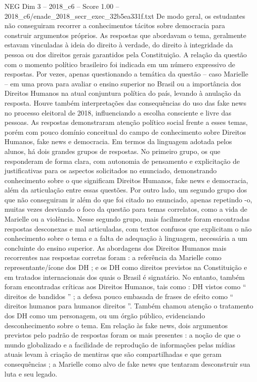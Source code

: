 \begin{textsample}{NEG Dim 3 – 2018\_c6 – Score 1.00 – 2018\_c6/enade\_2018\_secr\_exec\_32b5ea331f.txt}
De modo geral, os estudantes não conseguiram recorrer a conhecimentos tácitos sobre democracia para construir argumentos próprios.
As respostas que abordavam o tema, geralmente estavam vinculadas à ideia do direito à verdade, do direito à integridade da pessoa ou dos direitos gerais garantidos pela Constituição.
A relação da questão com o momento político brasileiro foi indicada em um número expressivo de respostas.
Por vezes, apenas questionando a temática da questão – caso Marielle – em uma prova para avaliar o ensino superior no Brasil ou a importância dos Direitos Humanos na atual conjuntura política do país, levando à anulação da resposta.
Houve também interpretações das consequências do uso das fake news no processo eleitoral de 2018, influenciando a escolha consciente e livre das pessoas.
As respostas demonstraram atenção político social frente a esses temas, porém com pouco domínio conceitual do campo de conhecimento sobre Direitos Humanos, fake news e democracia.
Em termos da linguagem adotada pelos alunos, há dois grandes grupos de respostas.
No primeiro grupo, os que responderam de forma clara, com autonomia de pensamento e explicitação de justificativas para os aspectos solicitados no enunciado, demonstrando conhecimento sobre o que significam Direitos Humanos, fake news e democracia, além da articulação entre essas questões.
Por outro lado, um segundo grupo dos que não conseguiram ir além do que foi citado no enunciado, apenas repetindo -o, muitas vezes desviando o foco da questão para temas correlatos, como a vida de Marielle ou a violência.
Nesse segundo grupo, mais facilmente foram encontradas respostas desconexas e mal articuladas, com textos confusos que explicitam o não conhecimento sobre o tema e a falta de adequação à linguagem, necessária a um concluinte do ensino superior.
As abordagens dos Direitos Humanos mais recorrentes nas respostas corretas foram : a referência da Marielle como representante/ícone dos DH ; e os DH como direitos previstos na Constituição e em tratados internacionais dos quais o Brasil é signatário.
No entanto, também foram encontradas críticas aos Direitos Humanos, tais como : DH vistos como “ direitos de bandidos ” ; a defesa pouco embasada de frases de efeito como “ direitos humanos para humanos direitos ”.
Também chamou atenção o tratamento dos DH como um personagem, ou um órgão público, evidenciando desconhecimento sobre o tema.
Em relação às fake news, dois argumentos previstos pelo padrão de respostas foram os mais presentes : a noção de que o mundo globalizado e a facilidade de reprodução de informações pelas mídias atuais levam à criação de mentiras que são compartilhadas e que geram consequências ; a Marielle como alvo de fake news que tentaram desconstruir sua luta e seu legado.

\end{textsample}
